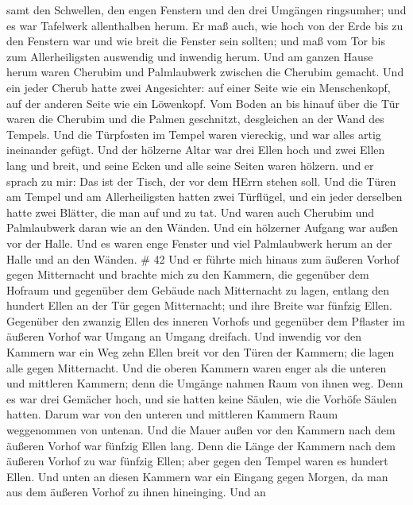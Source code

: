  samt den Schwellen, den engen Fenstern und den drei
Umgängen ringsumher; und es war Tafelwerk allenthalben herum.
 Er maß auch, wie hoch von der Erde bis zu den Fenstern war
und wie breit die Fenster sein sollten; und maß vom Tor bis zum
Allerheiligsten auswendig und inwendig herum.  Und am
ganzen Hause herum waren Cherubim und Palmlaubwerk zwischen die Cherubim
gemacht.  Und ein jeder Cherub hatte zwei Angesichter: auf
einer Seite wie ein Menschenkopf, auf der anderen Seite wie ein
Löwenkopf.  Vom Boden an bis hinauf über die Tür waren die
Cherubim und die Palmen geschnitzt, desgleichen an der Wand des Tempels.
 Und die Türpfosten im Tempel waren viereckig, und war
alles artig ineinander gefügt.  Und der hölzerne Altar war
drei Ellen hoch und zwei Ellen lang und breit, und seine Ecken und alle
seine Seiten waren hölzern. und er sprach zu mir: Das ist der Tisch, der
vor dem HErrn stehen soll.  Und die Türen am Tempel und am
Allerheiligsten  hatten zwei Türflügel, und ein jeder
derselben hatte zwei Blätter, die man auf und zu tat.  Und
waren auch Cherubim und Palmlaubwerk daran wie an den Wänden. Und ein
hölzerner Aufgang war außen vor der Halle.  Und es waren
enge Fenster und viel Palmlaubwerk herum an der Halle und an den Wänden.
\# 42  Und er führte mich hinaus zum äußeren Vorhof gegen
Mitternacht und brachte mich zu den Kammern, die gegenüber dem Hofraum
und gegenüber dem Gebäude nach Mitternacht zu lagen, 
entlang den hundert Ellen an der Tür gegen Mitternacht; und ihre Breite
war fünfzig Ellen.  Gegenüber den zwanzig Ellen des inneren
Vorhofs und gegenüber dem Pflaster im äußeren Vorhof war Umgang an
Umgang dreifach.  Und inwendig vor den Kammern war ein Weg
zehn Ellen breit vor den Türen der Kammern; die lagen alle gegen
Mitternacht.  Und die oberen Kammern waren enger als die
unteren und mittleren Kammern; denn die Umgänge nahmen Raum von ihnen
weg.  Denn es war drei Gemächer hoch, und sie hatten keine
Säulen, wie die Vorhöfe Säulen hatten. Darum war von den unteren und
mittleren Kammern Raum weggenommen von untenan.  Und die
Mauer außen vor den Kammern nach dem äußeren Vorhof war fünfzig Ellen
lang.  Denn die Länge der Kammern nach dem äußeren Vorhof zu
war fünfzig Ellen; aber gegen den Tempel waren es hundert Ellen.
 Und unten an diesen Kammern war ein Eingang gegen Morgen,
da man aus dem äußeren Vorhof zu ihnen hineinging.  Und an
